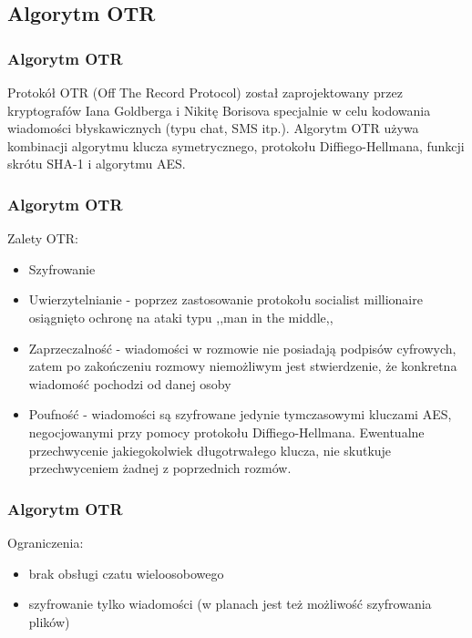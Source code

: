 \documentclass[xcolor=table]{beamer}
\begin{document}

\subsection{Algorytm OTR}

\begin{frame}
  \frametitle{Algorytm OTR}
	
Protokół OTR (Off The Record Protocol) został zaprojektowany przez kryptografów Iana Goldberga i Nikitę Borisova
specjalnie w celu kodowania wiadomości błyskawicznych (typu chat, SMS itp.).
Algorytm OTR używa kombinacji algorytmu klucza symetrycznego, 
protokołu Diffiego-Hellmana, funkcji skrótu SHA-1 i algorytmu AES. 

\end{frame}

\begin{frame}
  \frametitle{Algorytm OTR}

Zalety OTR:
\begin{itemize}
\item Szyfrowanie
\item Uwierzytelnianie - poprzez zastosowanie protokołu socialist millionaire 
osiągnięto ochronę na ataki typu ,,man in the middle,,
\item Zaprzeczalność - wiadomości w rozmowie nie posiadają podpisów cyfrowych,
zatem po zakończeniu rozmowy niemożliwym jest stwierdzenie, że konkretna 
wiadomość pochodzi od danej osoby
\item Poufność - wiadomości są szyfrowane jedynie tymczasowymi kluczami AES, negocjowanymi przy pomocy protokołu Diffiego-Hellmana. Ewentualne przechwycenie jakiegokolwiek długotrwałego klucza, nie skutkuje przechwyceniem żadnej z poprzednich rozmów.
\end{itemize}
\end{frame}

\begin{frame}
  \frametitle{Algorytm OTR}
  
Ograniczenia:
\begin{itemize}
\item brak obsługi czatu wieloosobowego
\item szyfrowanie tylko wiadomości (w planach jest też możliwość szyfrowania plików)
\end{itemize}
\end{frame}

\end{document}
